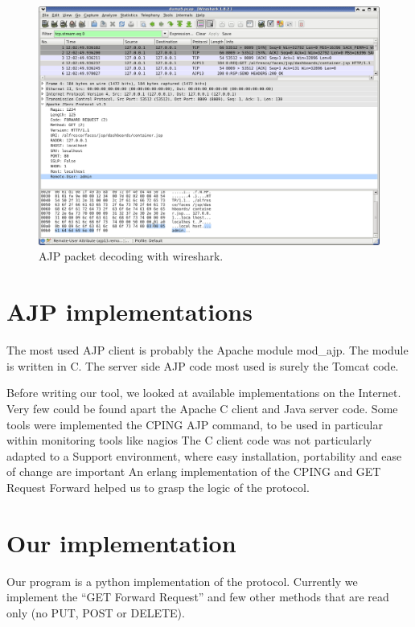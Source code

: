 \documentclass[12pt,a4]{article}
\begin{document}
\begin{figure}[htb]
\begin{center}
\includegraphics[width=180mm]{get_forward}
\caption{AJP packet decoding with wireshark.}
\label{sc1}
\end{center}
\end{figure}


\section{AJP implementations}

The most used AJP client is probably the Apache module mod\_ajp.
The module is written in C.
The server side AJP code most used is surely the Tomcat code.

Before writing our tool, we looked at available implementations on the Internet. Very few could be found apart the Apache C client and Java server code. Some tools were implemented the CPING AJP command, to be used in particular within monitoring tools like nagios\cite{nagios}
The C client code was not particularly adapted to a Support environment, where easy installation, portability and ease of change are important
An erlang implementation\cite{ajperlang} of the CPING and GET Request Forward helped us to grasp the logic of the protocol.


\section{Our implementation}

Our program is a python implementation of the protocol. Currently we implement the ``GET Forward Request'' and few other methods that are read only (no PUT, POST or DELETE).
\end{document}
